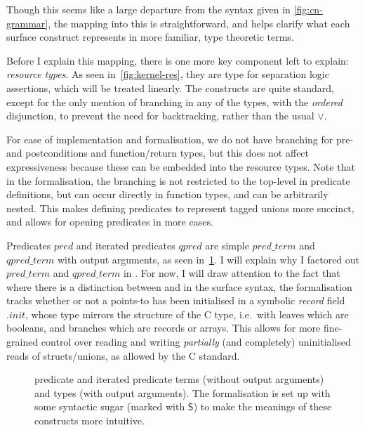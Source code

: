 Though this seems like a large departure from the syntax given in
\cref{fig:cn-grammar}, the mapping into this is straightforward, and helps
clarify what each  surface construct represents in more familiar,
type theoretic terms.

Before I explain this mapping, there is one more key component left to explain:
\emph{resource types}. As seen in~\cref{fig:kernel-res}, they are type for
separation logic assertions, which will be treated linearly. The constructs are
quite standard, except for the only mention of branching in any of the types,
with the \emph{ordered} disjunction, to prevent the need for backtracking,
rather than the usual $\vee{}$.

For ease of implementation and formalisation, we do not have branching for pre-
and postconditions and function/return types, but this does not affect
expressiveness because these can be embedded into the resource types. Note that
in the formalisation, the branching is not restricted to the top-level in
predicate definitions, but can occur directly in function types, and can be
arbitrarily nested. This makes defining predicates to represent tagged unions
more succinct, and allows for opening predicates in more cases.

Predicates ${pred}$ and iterated predicates ${qpred}$ are simple ${pred\_term}$
and ${qpred\_term}$ with output arguments, as seen in~\cref{fig:kernel-qpred}.
I will explain why I factored out ${pred\_term}$ and ${qpred\_term}$ in
. For now, I will draw attention to the fact that
where there is a distinction between  and  in
the surface syntax, the formalisation tracks whether or not a points-to has
been initialised in a symbolic \emph{record} field ${.init}$, whose type
mirrors the structure of the C type, i.e.\ with leaves which are booleans, and
branches which are records or arrays. This allows for more fine-grained control
over reading and writing \emph{partially} (and completely) uninitialised reads
of structs/unions,\label{sn:partial-init-read}
as allowed by the C standard.

\begin{figure}
    \raggedright{}
    \grammartabularSTY{%
        \cnpredXXname{}\cninterrule{}
        \cnpredXXterm{}\cninterrule{}
    }
    \begingroup%
    \renewcommand{\cnprodline}{\cnprodlineCommentNewline}
    \grammartabularSTY{
        \cnqpredXXterm{}\cninterrule{}
        \cnqpred{}\cninterrule{}
    }
    \endgroup%
    \caption{ predicate and iterated predicate terms (without
        output arguments) and types (with output arguments). The formalisation
        is set up with some syntactic sugar (marked with $\mathsf{S}$) to make
        the meanings of these constructs more intuitive.}\label{fig:kernel-qpred}

\end{figure}

